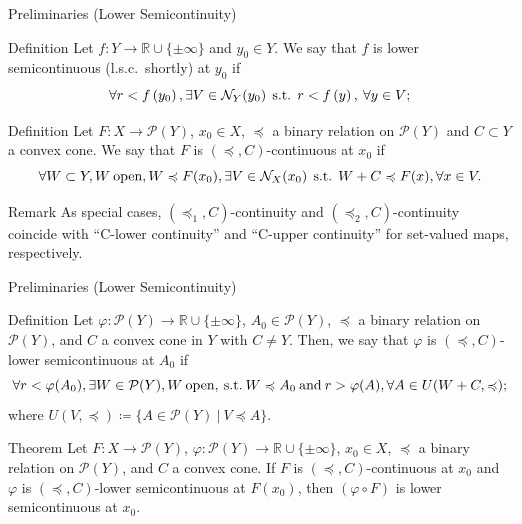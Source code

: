 \documentclass[aspectratio=169, dvipdfmx, 11pt]{beamer}
\newcommand{\RealNumberSet}{\mathbb{R}}
\newcommand{\Nbd}[2]{\mbox{$\mathcal{N}_{#1}({#2})$}}
\newcommand{\SuchThat}{\:\text{s.t.}\:}
\newcommand{\SetForm}[2]{
  \{{#1}\:|\:{#2}\}
}
\begin{document}
\begin{frame}{Preliminaries (Lower Semicontinuity)}
  \begin{block}{Definition}
    Let $f:Y\rightarrow \RealNumberSet \cup \{ \pm \infty\}$ and $y_{0}\in{Y}$.
    We say that $f$ is
    lower semicontinuous (l.s.c.\ shortly) at $y_{0}$ if
    \begin{equation}
      \forall r < f \left( y_{0} \right),
      \exists V \in \Nbd{Y}{y_{0}} \:\SuchThat\: r < f \left( y \right),\: \forall y \in V; \notag
    \end{equation}
  \end{block}

  \begin{block}{Definition \cite{500001551932}}
    Let $F \colon X \to \mathcal{P}(Y)$, $x_0 \in X$, $\preccurlyeq$ a binary relation on $\mathcal{P}(Y)$
    and $C \subset Y$ a convex cone. We say that $F$ is $(\preccurlyeq, C)$-continuous at $x_0$ if
    \begin{equation}
      \forall W \subset Y, W\:\text{open},W \preccurlyeq F(x_0), \exists V \in \mathcal{N}_{X}(x_0) \:\SuchThat\: W + C \preccurlyeq F(x), \forall x \in V. \notag
    \end{equation}
  \end{block}

  \begin{alertblock}{Remark}
    As special cases, $(\preccurlyeq_1, C)$-continuity and $(\preccurlyeq_2, C)$-continuity coincide with “C-lower
    continuity” and “C-upper continuity” for set-valued maps, respectively.
  \end{alertblock}
\end{frame}

\begin{frame}{Preliminaries (Lower Semicontinuity)}
  \begin{block}{Definition \cite{500001551932}}
    Let $\varphi \colon \mathcal{P}(Y) \to \RealNumberSet \cup \{\pm \infty\}$, $A_0 \in \mathcal{P}(Y)$,
    $\preccurlyeq$ a binary relation on $\mathcal{P}(Y)$, and $C$ a convex cone in $Y$ with $C \ne Y$. Then,
    we say that $\varphi$ is $(\preccurlyeq, C)$-lower semicontinuous at $A_0$ if
    \begin{equation}
      \forall r < \varphi (A_0), \exists W \in \mathcal{P}(Y), W\:\text{open}, \SuchThat W \preccurlyeq A_0 \:\text{and}\:
      r > \varphi (A), \forall A \in U(W + C, \preccurlyeq); \notag
    \end{equation}
    where $U(V,\preccurlyeq) \coloneqq \SetForm{A \in \mathcal{P}(Y)}{V \preccurlyeq A}$.
  \end{block}

  \begin{block}{Theorem \cite{500001551932}}
    Let $F \colon X \to \mathcal{P}(Y)$, $\varphi \colon \mathcal{P}(Y) \to \RealNumberSet \cup \{\pm \infty\}$, $x_0 \in X$,
    $\preccurlyeq$ a binary relation on $\mathcal{P}(Y)$, and $C$ a convex cone. If $F$ is $(\preccurlyeq, C)$-continuous at $x_0$
    and $\varphi$ is $(\preccurlyeq, C)$-lower semicontinuous at $F(x_0)$, then $(\varphi \circ F)$ is lower semicontinuous at $x_0$.
  \end{block}
\end{frame}
\end{document}
